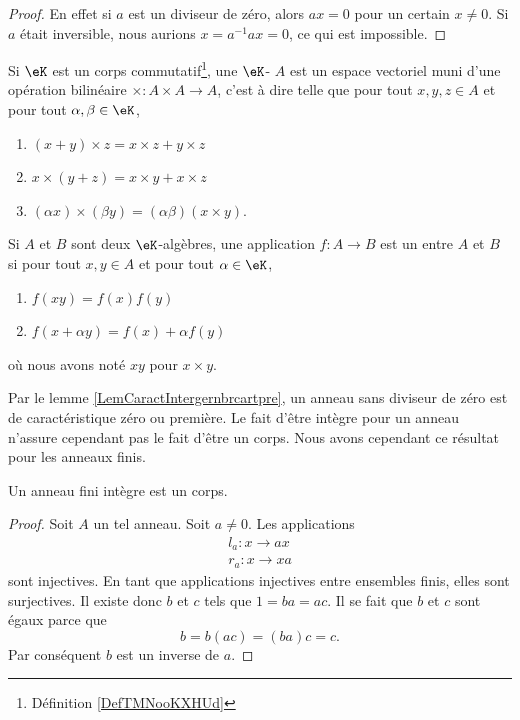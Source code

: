 \begin{proof}
    En effet si \( a\) est un diviseur de zéro, alors \( ax=0\) pour un certain \( x\neq 0\). Si \( a\) était inversible, nous aurions \( x=a^{-1}ax=0\), ce qui est impossible.
\end{proof}

\begin{definition}   \label{DefAEbnJqI}
    Si \( \eK\) est un corps commutatif\footnote{Définition \ref{DefTMNooKXHUd}}, une \( \eK\)- \( A\) est un espace vectoriel muni d'une opération bilinéaire \( \times\colon A\times A\to A\), c'est à dire telle que pour tout \( x,y,z\in A\) et pour tout \( \alpha,\beta\in\eK\),
    \begin{enumerate}
        \item
            \( (x+y)\times z=x\times z+y\times z\)
        \item
            \( x\times (y+z)=x\times y+x\times z\)
        \item
            \( (\alpha x)\times (\beta y)=(\alpha\beta)(x\times y)\).
    \end{enumerate}
    Si \( A\) et \( B\) sont deux \( \eK\)-algèbres, une application \( f\colon A\to B\) est un  entre \( A\) et \( B\) si pour tout \( x,y\in A\) et pour tout \( \alpha\in \eK\),
    \begin{enumerate}
        \item
            \( f(xy)=f(x)f(y)\)
        \item
            \( f(x+\alpha y)=f(x)+\alpha f(y)\)
    \end{enumerate}
    où nous avons noté \( xy\) pour \( x\times y\).
\end{definition}


Par le lemme \ref{LemCaractIntergernbrcartpre}, un anneau sans diviseur de zéro est de caractéristique zéro ou première. Le fait d'être intègre pour un anneau n'assure cependant pas le fait d'être un corps. Nous avons cependant ce résultat pour les anneaux finis.

\begin{proposition}     \label{PropanfinintimpCorp}
    Un anneau fini intègre est un corps.
\end{proposition}

\begin{proof}
    Soit \( A\) un tel anneau. Soit \( a\neq 0\). Les applications 
    \begin{subequations}
        \begin{align}
            l_a\colon x\to ax\\
            r_a\colon x\to xa
        \end{align}
    \end{subequations}
    sont injectives. En tant que applications injectives entre ensembles finis, elles sont surjectives. Il existe donc \( b\) et \( c\) tels que \( 1=ba=ac\). Il se fait que \( b\) et \( c\) sont égaux parce que
    \begin{equation}
        b=b(ac)=(ba)c=c.
    \end{equation}
    Par conséquent \( b\) est un inverse de \( a\).
\end{proof}

